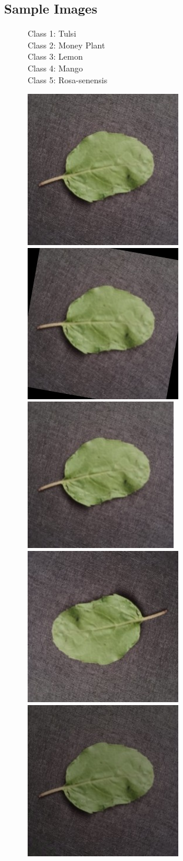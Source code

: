 \documentclass[twocolumn]{article}
\begin{document}
\subsection{Sample Images}
\begin{figure}[t]
\centering
\begin{minipage}{0.15\columnwidth}
Class 1: Tulsi\\[2em]
Class 2: Money Plant\\[2em]
Class 3: Lemon\\[2em]
Class 4: Mango\\[2em]
Class 5: Rosa-senensis
\end{minipage}%
\begin{minipage}{0.85\columnwidth}
\includegraphics[width=0.2\columnwidth]{img/tulsi/tulsi1.jpg}%
\includegraphics[width=0.2\columnwidth]{img/tulsi/tulsi2.jpg}%
\includegraphics[width=0.2\columnwidth]{img/tulsi/tulsi3.jpg}%
\includegraphics[width=0.2\columnwidth]{img/tulsi/tulsi4.jpg}%
\includegraphics[width=0.2\columnwidth]{img/tulsi/tulsi5.jpg}\\[-0.5pt]

\end{minipage}
\end{figure}
\end{document}
